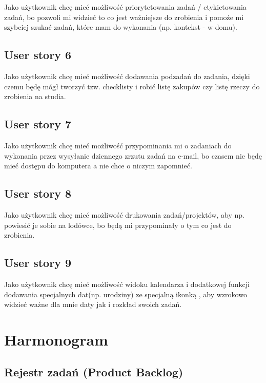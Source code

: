 \documentclass[a4paper]{article}
\begin{document}
Jako użytkownik chcę mieć możliwość priorytetowania zadań / etykietowania zadań, bo pozwoli mi widzieć to co jest ważniejsze do zrobienia i pomoże mi szybciej szukać zadań, które mam do wykonania (np. kontekst - w domu).

\subsection{User story 6}
\label{subsec:UserStory6}

Jako użytkownik chcę mieć możliwość dodawania podzadań do zadania, dzięki czemu będę mógł tworzyć tzw. checklisty i robić listę zakupów czy listę rzeczy do zrobienia na studia.

\subsection{User story 7}
\label{subsec:UserStory7}

Jako użytkownik chcę mieć możliwość przypominania mi o zadaniach do wykonania  przez wysyłanie dziennego zrzutu zadań na e-mail, bo czasem nie będę mieć dostępu do komputera a nie chce o niczym zapomnieć.

\subsection{User story 8}
\label{subsec:UserStory8}

Jako użytkownik chcę mieć możliwość drukowania zadań/projektów, aby np. powiesić je sobie na lodówce, bo będą mi przypominały o tym co jest do zrobienia.

\subsection{User story 9}
\label{subsec:UserStory9}

Jako użytkownik chcę mieć możliwość widoku kalendarza i dodatkowej funkcji dodawania specjalnych dat(np. urodziny) ze specjalną ikonką , aby wzrokowo widzieć ważne dla mnie daty jak i rozkład swoich zadań.


\newpage
\section{Harmonogram}
\label{sec:Harmonogram}

\subsection{Rejestr zadań (Product Backlog)}
\label{subsec:RejestrZadan}
\end{document}
